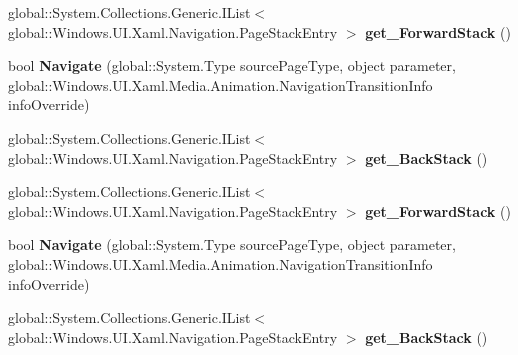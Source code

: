 \begin{DoxyCompactItemize}
global\+::\+System.\+Collections.\+Generic.\+I\+List$<$ global\+::\+Windows.\+U\+I.\+Xaml.\+Navigation.\+Page\+Stack\+Entry $>$ {\bfseries get\+\_\+\+Forward\+Stack} ()
\item 
\mbox{\label{interface_windows_1_1_u_i_1_1_xaml_1_1_controls_1_1_i_frame2_a32261d4af33cf5fe60bbf99cf9aaad33}} 
bool {\bfseries Navigate} (global\+::\+System.\+Type source\+Page\+Type, object parameter, global\+::\+Windows.\+U\+I.\+Xaml.\+Media.\+Animation.\+Navigation\+Transition\+Info info\+Override)
\item 
\mbox{\label{interface_windows_1_1_u_i_1_1_xaml_1_1_controls_1_1_i_frame2_ade8b031cab9ada8cf6038a885fabfe5c}} 
global\+::\+System.\+Collections.\+Generic.\+I\+List$<$ global\+::\+Windows.\+U\+I.\+Xaml.\+Navigation.\+Page\+Stack\+Entry $>$ {\bfseries get\+\_\+\+Back\+Stack} ()
\item 
\mbox{\label{interface_windows_1_1_u_i_1_1_xaml_1_1_controls_1_1_i_frame2_a49daee7f2dba9da8ec0551c2b9170002}} 
global\+::\+System.\+Collections.\+Generic.\+I\+List$<$ global\+::\+Windows.\+U\+I.\+Xaml.\+Navigation.\+Page\+Stack\+Entry $>$ {\bfseries get\+\_\+\+Forward\+Stack} ()
\item 
\mbox{\label{interface_windows_1_1_u_i_1_1_xaml_1_1_controls_1_1_i_frame2_a32261d4af33cf5fe60bbf99cf9aaad33}} 
bool {\bfseries Navigate} (global\+::\+System.\+Type source\+Page\+Type, object parameter, global\+::\+Windows.\+U\+I.\+Xaml.\+Media.\+Animation.\+Navigation\+Transition\+Info info\+Override)
\item 
\mbox{\label{interface_windows_1_1_u_i_1_1_xaml_1_1_controls_1_1_i_frame2_ade8b031cab9ada8cf6038a885fabfe5c}} 
global\+::\+System.\+Collections.\+Generic.\+I\+List$<$ global\+::\+Windows.\+U\+I.\+Xaml.\+Navigation.\+Page\+Stack\+Entry $>$ {\bfseries get\+\_\+\+Back\+Stack} ()
\item 
\mbox{\label{interface_windows_1_1_u_i_1_1_xaml_1_1_controls_1_1_i_frame2_a49daee7f2dba9da8ec0551c2b9170002}} 

\end{DoxyCompactItemize}
